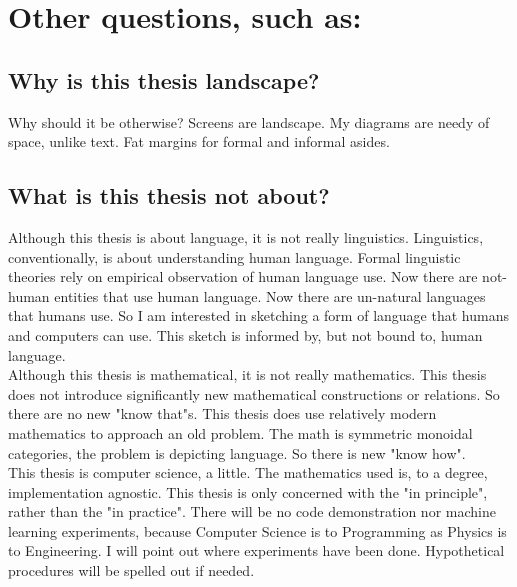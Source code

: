 \section{Other questions, such as:}
\subsection{Why is this thesis landscape?} Why should it be otherwise? Screens are landscape. My diagrams are needy of space, unlike text. Fat margins for formal and informal asides.

\subsection{What is this thesis not about?} Although this thesis is about language, it is not really linguistics.
Linguistics, conventionally, is about understanding human language.
Formal linguistic theories rely on empirical observation of human language use.
Now there are not-human entities that use human language.
Now there are un-natural languages that humans use.
So I am interested in sketching a form of language that humans and computers can use.
This sketch is informed by, but not bound to, human language.\\

Although this thesis is mathematical, it is not really mathematics.
This thesis does not introduce significantly new mathematical constructions or relations.
So there are no new "know that"s.
This thesis does use relatively modern mathematics to approach an old problem.
The math is symmetric monoidal categories, the problem is depicting language.
So there is new "know how".\\

This thesis is computer science, a little.
The mathematics used is, to a degree, implementation agnostic.
This thesis is only concerned with the "in principle", rather than the "in practice".
There will be no code demonstration nor machine learning experiments, because
Computer Science is to Programming as Physics is to Engineering.
I will point out where experiments have been done.
Hypothetical procedures will be spelled out if needed.


